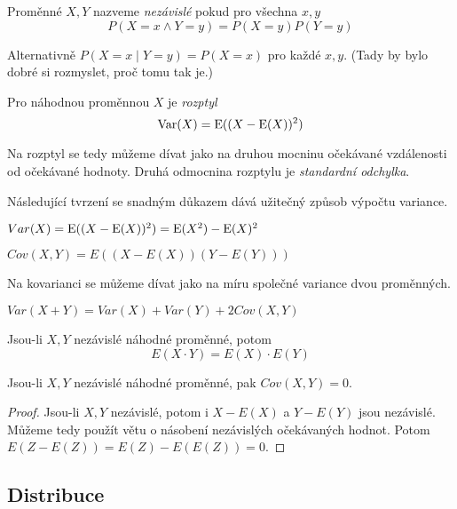 \begin{definition}
    Proměnné $X,Y$ nazveme {\em nezávislé} pokud pro všechna $x,y$
    \[
        P(X = x \land Y = y) = P(X = y) P(Y = y)
    \]
\end{definition}

Alternativně $P(X = x \mid Y = y) = P(X = x)$ pro každé $x,y$. (Tady by
bylo dobré si rozmyslet, proč tomu tak je.)

\begin{definition}
    Pro náhodnou proměnnou $X$ je {\em rozptyl}
    \[ \operatorname{Var}(X) = \operatorname{E}( (X - \operatorname{E}(X))^2 ) \]
\end{definition}

Na rozptyl se tedy můžeme dívat jako na druhou mocninu očekávané
vzdálenosti od očekávané hodnoty. Druhá odmocnina rozptylu je
{\em standardní odchylka}.

Následující tvrzení se snadným důkazem dává užitečný způsob výpočtu
variance.

\begin{claim}
    $ Var(X) = \operatorname{E}( (X - \operatorname{E}(X))^2 ) = \operatorname{E}(X^2) - \operatorname{E}(X)^2 $
\end{claim}

\begin{definition}[Kovariance]
    $ Cov(X,Y) = E((X - E(X))(Y - E(Y))) $
\end{definition}

Na kovarianci se můžeme dívat jako na míru společné variance dvou
proměnných.

\begin{claim}
    $Var(X + Y) = Var(X) + Var(Y) + 2 Cov(X,Y)$
\end{claim}

\begin{theorem}
    Jsou-li $X, Y$ nezávislé náhodné proměnné, potom
    \[ E(X \cdot Y) = E(X) \cdot E(Y) \]
\end{theorem}


\begin{corollary}
    Jsou-li $X, Y$ nezávislé náhodné proměnné, pak $Cov(X,Y) = 0$.
\end{corollary}

\begin{proof}
    Jsou-li $X, Y$ nezávislé, potom i $X - E(X)$ a $Y - E(Y)$ jsou
    nezávislé. Můžeme tedy použít větu o násobení nezávislých
    očekávaných hodnot. Potom $E(Z - E(Z)) = E(Z) - E(E(Z)) = 0$.
\end{proof}

\subsection{Distribuce}

